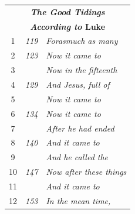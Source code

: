\documentclass{article}
\newlength{\minipageheight}
\newlength{\minipagewidth}
\begin{document}
\begin{minipage}[r][\minipageheight][t]{\minipagewidth}
\begin{longtable}{ccl}
        \multicolumn{3}{c}{\textbf{\textit{The Good Tidings}}}        \\
        \multicolumn{3}{c}{\textbf{\textit{According to} Luke}}       \\
        \hline
        1           & \textit{119}  & \textit{Forasmuch as many}      \\
        2           & \textit{123}  & \textit{Now it came to}         \\
        3           &               & \textit{Now in the fifteenth}   \\
        4           & \textit{129}  & \textit{And Jesus, full of}     \\
        5           &               & \textit{Now it came to}         \\
        6           & \textit{134}  & \textit{Now it came to}         \\
        7           &               & \textit{After he had ended}     \\
        8           & \textit{140}  & \textit{And it came to}         \\
        9           &               & \textit{And he called the}      \\
        10          & \textit{147}  & \textit{Now after these things} \\
        11          &               & \textit{And it came to}         \\
        12          & \textit{153}  & \textit{In the mean time,}      \\
    \end{longtable}
\end{minipage}%
%
%
\end{document}
